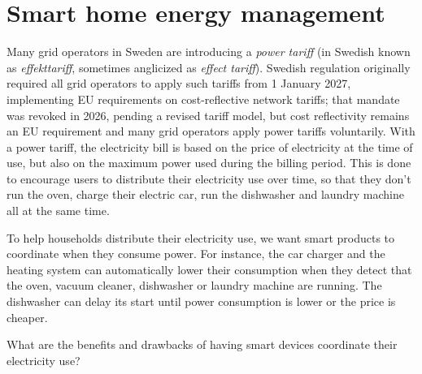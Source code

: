 \chapter{Smart home energy management}\label{SmartEnergyStatement}

Many grid operators in Sweden are introducing a \emph{power tariff}
(in Swedish known as \emph{\foreignlanguage{swedish}{effekttariff}},
sometimes anglicized as \emph{effect tariff}).
Swedish regulation originally required all grid operators to apply such
tariffs from 1 January 2027, implementing EU requirements on
cost-reflective network tariffs; that mandate was revoked in 2026,
pending a revised tariff model, but cost reflectivity remains an EU
requirement and many grid operators apply power tariffs voluntarily.
With a power tariff, the electricity bill is based on the price of
electricity at the time of use, but also on the maximum power used during
the billing period.
This is done to encourage users to distribute their electricity use over time,
so that they don't run the oven, charge their electric car, run the dishwasher
and laundry machine all at the same time.

To help households distribute their electricity use, we want smart products to
coordinate when they consume power.
For instance, the car charger and the heating system can automatically lower
their consumption when they detect that the oven, vacuum cleaner, dishwasher
or laundry machine are running.
The dishwasher can delay its start until power consumption is lower or the
price is cheaper.

\begin{exercise}\label{EnergyBenefitsDrawbacks}
  What are the benefits and drawbacks of having smart devices coordinate
  their electricity use?
\end{exercise}

